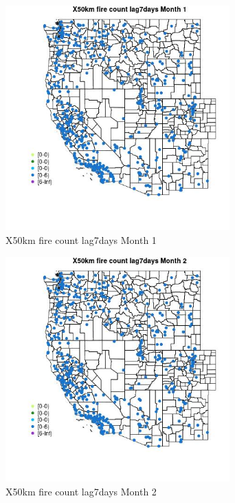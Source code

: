 \begin{figure} 
\centering  
\includegraphics[width=0.77\textwidth]{Code_Outputs/Report_ML_input_PM25_Step4_part_e_de_duplicated_aves_compiled_2019-05-14wNAs_MapObsMo1X50km_fire_count_lag7days.jpg} 
\caption{\label{fig:Report_ML_input_PM25_Step4_part_e_de_duplicated_aves_compiled_2019-05-14wNAsMapObsMo1X50km_fire_count_lag7days}X50km fire count lag7days Month 1} 
\end{figure} 
 

\begin{figure} 
\centering  
\includegraphics[width=0.77\textwidth]{Code_Outputs/Report_ML_input_PM25_Step4_part_e_de_duplicated_aves_compiled_2019-05-14wNAs_MapObsMo2X50km_fire_count_lag7days.jpg} 
\caption{\label{fig:Report_ML_input_PM25_Step4_part_e_de_duplicated_aves_compiled_2019-05-14wNAsMapObsMo2X50km_fire_count_lag7days}X50km fire count lag7days Month 2} 
\end{figure} 
 

